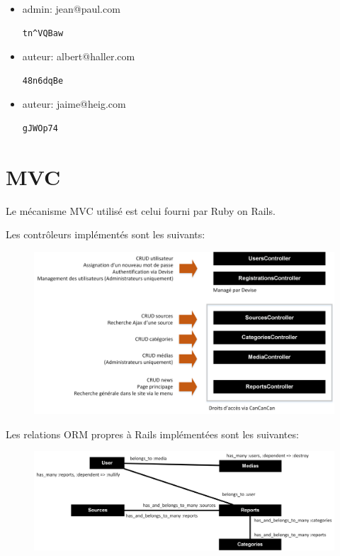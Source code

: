 \documentclass{article}
\begin{document}
\begin{itemize}
\item admin: jean@paul.com \begin{verbatim}tn^VQBaw\end{verbatim}
\item auteur: albert@haller.com \begin{verbatim}48n6dqBe\end{verbatim}
\item auteur: jaime@heig.com \begin{verbatim}gJWOp74\end{verbatim}
\end{itemize}

\newpage
\section{MVC}

Le mécanisme MVC utilisé est celui fourni par Ruby on Rails.

\par\null\par

Les contrôleurs implémentés sont les suivants:

\begin{figure}[h]
  \centering
  \includegraphics[width=14cm]{mvc}
\end{figure}

Les relations ORM propres à Rails implémentées sont les suivantes:

\begin{figure}[h]
  \centering
  \includegraphics[width=14cm]{relations}
\end{figure}
\end{document}

